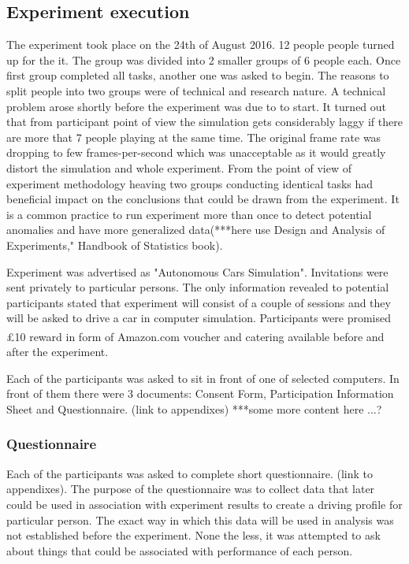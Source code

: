 \documentclass[11pt,english]{article}
\begin{document}


\subsection{Experiment execution}

The experiment took place on the 24th of August 2016. 12 people people turned up for the it. The group was divided into 2 smaller groups of 6 people each. Once first group completed all tasks, another one was asked to begin. The reasons to split people into two groups were of technical and research nature. A technical problem arose shortly before the experiment was due to to start. It turned out that from participant point of view the simulation gets considerably laggy if there are more that 7 people playing at the same time. The original frame rate was dropping to few frames-per-second which was unacceptable as it would greatly distort the simulation and whole experiment. From the point of view of experiment methodology heaving two groups conducting identical tasks had beneficial impact on the conclusions that could be drawn from the experiment. It is a common practice to run experiment more than once to detect potential anomalies and have more generalized data(***here use Design and Analysis of Experiments," Handbook of Statistics book).





Experiment was advertised as "Autonomous Cars Simulation". Invitations were sent privately to particular persons. The only information revealed to potential participants stated that experiment will consist of a couple of sessions and they will be asked to drive a car in computer simulation. Participants were promised £10 reward in form of Amazon.com\textsuperscript{\textregistered} voucher and catering available before and after the experiment.


Each of the participants was asked to sit in front of one of selected computers. In front of them there were 3 documents: Consent Form, Participation Information Sheet and Questionnaire. (link to appendixes)
***some more content here
...?

\subsubsection{Questionnaire}

Each of the participants was asked to complete short questionnaire. (link to appendixes). The purpose of the questionnaire was to collect data that later could be used in association with experiment results to create a driving profile for particular person. The exact way in which this data will be used in analysis was not established before the experiment. None the less, it was attempted to ask about things that could be associated with performance of each person.
\end{document}
